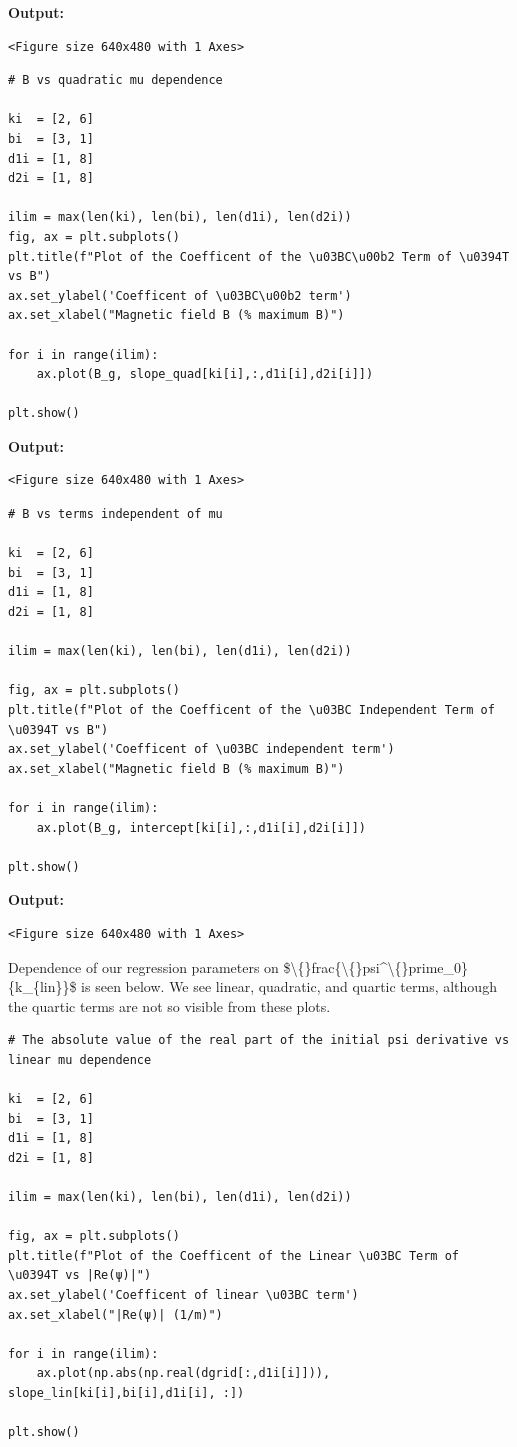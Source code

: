 \documentclass{article}
\begin{document}
\textbf{Output:}\begin{verbatim}
<Figure size 640x480 with 1 Axes>
\end{verbatim}

\begin{lstlisting}
# B vs quadratic mu dependence

ki  = [2, 6]
bi  = [3, 1]
d1i = [1, 8]
d2i = [1, 8]

ilim = max(len(ki), len(bi), len(d1i), len(d2i))
fig, ax = plt.subplots()
plt.title(f"Plot of the Coefficent of the \u03BC\u00b2 Term of \u0394T vs B")
ax.set_ylabel('Coefficent of \u03BC\u00b2 term')
ax.set_xlabel("Magnetic field B (% maximum B)")

for i in range(ilim):
    ax.plot(B_g, slope_quad[ki[i],:,d1i[i],d2i[i]])

plt.show()\end{lstlisting}

\textbf{Output:}\begin{verbatim}
<Figure size 640x480 with 1 Axes>
\end{verbatim}

\begin{lstlisting}
# B vs terms independent of mu

ki  = [2, 6]
bi  = [3, 1]
d1i = [1, 8]
d2i = [1, 8]

ilim = max(len(ki), len(bi), len(d1i), len(d2i))

fig, ax = plt.subplots()
plt.title(f"Plot of the Coefficent of the \u03BC Independent Term of \u0394T vs B")
ax.set_ylabel('Coefficent of \u03BC independent term')
ax.set_xlabel("Magnetic field B (% maximum B)")

for i in range(ilim):
    ax.plot(B_g, intercept[ki[i],:,d1i[i],d2i[i]])

plt.show()\end{lstlisting}

\textbf{Output:}\begin{verbatim}
<Figure size 640x480 with 1 Axes>
\end{verbatim}

Dependence of our regression parameters on \$\textbackslash\{\}frac\{\textbackslash\{\}psi\textasciicircum{}\textbackslash\{\}prime\_0\}\{k\_\{lin\}\}\$ is seen below. We see linear, quadratic, and quartic terms, although the quartic terms are not so visible from these plots.

\begin{lstlisting}
# The absolute value of the real part of the initial psi derivative vs linear mu dependence

ki  = [2, 6]
bi  = [3, 1]
d1i = [1, 8]
d2i = [1, 8]

ilim = max(len(ki), len(bi), len(d1i), len(d2i))

fig, ax = plt.subplots()
plt.title(f"Plot of the Coefficent of the Linear \u03BC Term of \u0394T vs |Re(ψ)|")
ax.set_ylabel('Coefficent of linear \u03BC term')
ax.set_xlabel("|Re(ψ)| (1/m)")

for i in range(ilim):
    ax.plot(np.abs(np.real(dgrid[:,d1i[i]])), slope_lin[ki[i],bi[i],d1i[i], :])

plt.show()\end{lstlisting}
\end{document}
